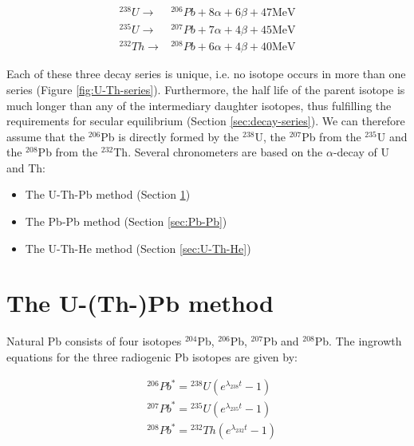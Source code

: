 \documentclass{book}
\begin{document}
\begin{equation}
\begin{array}{rl}
^{238}U \rightarrow & {}^{206}Pb + 8\alpha + 6\beta + 47\mbox{MeV} \\ 
^{235}U \rightarrow & {}^{207}Pb + 7\alpha + 4\beta + 45\mbox{MeV} \\
^{232}Th \rightarrow & {}^{208}Pb + 6\alpha + 4\beta + 40\mbox{MeV} 
\end{array}
\label{eq:UThdecay}
\end{equation}

Each of these three decay series is unique, i.e. no isotope occurs in
more than one series (Figure \ref{fig:U-Th-series}). Furthermore, the
half life of the parent isotope is much longer than any of the
intermediary daughter isotopes, thus fulfilling the requirements for
secular equilibrium (Section \ref{sec:decay-series}). We can therefore
assume that the $^{206}$Pb is directly formed by the $^{238}$U, the
$^{207}$Pb from the $^{235}$U and the $^{208}$Pb from the
$^{232}$Th. Several chronometers are based on the $\alpha$-decay of U
and Th:

\begin{itemize}
\item The U-Th-Pb method (Section \ref{sec:U-Th-Pb})
\item The Pb-Pb method (Section \ref{sec:Pb-Pb})
\item The U-Th-He method (Section \ref{sec:U-Th-He})
\end{itemize}

\section{The U-(Th-)Pb method}
\label{sec:U-Th-Pb}

Natural Pb consists of four isotopes $^{204}$Pb, $^{206}$Pb,
$^{207}$Pb and $^{208}$Pb. The ingrowth equations for
the three radiogenic Pb isotopes are given by:

\begin{equation}
  \begin{array}{rl}
    &{}^{206}Pb^* = {}^{238}U \left(e^{\lambda_{238}t} - 1\right)\\ 
    &{}^{207}Pb^* = {}^{235}U \left(e^{\lambda_{235}t} - 1\right)\\ 
    &{}^{208}Pb^* = {}^{232}Th \left(e^{\lambda_{232}t} - 1\right)
  \end{array}
  \label{eq:Pb*}
\end{equation}
\end{document}

